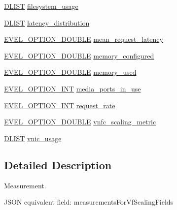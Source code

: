 \begin{DoxyCompactItemize}
\item 
\hyperlink{double__list_8h_a45f4a129042d9e1aa4ffd31fe13e4d14}{D\+L\+I\+ST} \hyperlink{structevent__measurement_a7d01f500029deef0550691678f9a4de2}{filesystem\+\_\+usage}
\item 
\hyperlink{double__list_8h_a45f4a129042d9e1aa4ffd31fe13e4d14}{D\+L\+I\+ST} \hyperlink{structevent__measurement_a6196660aa48b40e8a571b7d15152c519}{latency\+\_\+distribution}
\item 
\hyperlink{evel_8h_aafc42b3cd9aca88804c3d413e4ccec06}{E\+V\+E\+L\+\_\+\+O\+P\+T\+I\+O\+N\+\_\+\+D\+O\+U\+B\+LE} \hyperlink{structevent__measurement_ab617498b1c08049795022e7891da39aa}{mean\+\_\+request\+\_\+latency}
\item 
\hyperlink{evel_8h_aafc42b3cd9aca88804c3d413e4ccec06}{E\+V\+E\+L\+\_\+\+O\+P\+T\+I\+O\+N\+\_\+\+D\+O\+U\+B\+LE} \hyperlink{structevent__measurement_aaf593d6c87242c0dffc5720887ce3444}{memory\+\_\+configured}
\item 
\hyperlink{evel_8h_aafc42b3cd9aca88804c3d413e4ccec06}{E\+V\+E\+L\+\_\+\+O\+P\+T\+I\+O\+N\+\_\+\+D\+O\+U\+B\+LE} \hyperlink{structevent__measurement_a0a3ac02cbc8ca1dcd3c0c498c8e751dd}{memory\+\_\+used}
\item 
\hyperlink{evel_8h_a452d825778d1c2368a54b8f689a25ba7}{E\+V\+E\+L\+\_\+\+O\+P\+T\+I\+O\+N\+\_\+\+I\+NT} \hyperlink{structevent__measurement_a4d246f5b2272849271401fb5c9c0b3b0}{media\+\_\+ports\+\_\+in\+\_\+use}
\item 
\hyperlink{evel_8h_a452d825778d1c2368a54b8f689a25ba7}{E\+V\+E\+L\+\_\+\+O\+P\+T\+I\+O\+N\+\_\+\+I\+NT} \hyperlink{structevent__measurement_ac0967e30d7b1e0856e0a0008711ffb87}{request\+\_\+rate}
\item 
\hyperlink{evel_8h_aafc42b3cd9aca88804c3d413e4ccec06}{E\+V\+E\+L\+\_\+\+O\+P\+T\+I\+O\+N\+\_\+\+D\+O\+U\+B\+LE} \hyperlink{structevent__measurement_a85193cc6ed303d8e386d1d7a405bc0af}{vnfc\+\_\+scaling\+\_\+metric}
\item 
\hyperlink{double__list_8h_a45f4a129042d9e1aa4ffd31fe13e4d14}{D\+L\+I\+ST} \hyperlink{structevent__measurement_a2fcf32022554986d2e7e31cf561abbc4}{vnic\+\_\+usage}
\end{DoxyCompactItemize}


\subsection{Detailed Description}
Measurement. 

J\+S\+ON equivalent field\+: measurements\+For\+Vf\+Scaling\+Fields 

